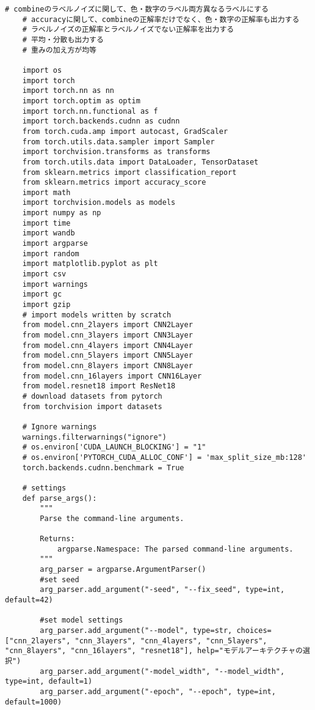 \begin{lstlisting}[style=pythonstyle, caption={メインコード}]
    # combineのラベルノイズに関して、色・数字のラベル両方異なるラベルにする
    # accuracyに関して、combineの正解率だけでなく、色・数字の正解率も出力する
    # ラベルノイズの正解率とラベルノイズでない正解率を出力する
    # 平均・分散も出力する
    # 重みの加え方が均等
    
    import os
    import torch
    import torch.nn as nn
    import torch.optim as optim
    import torch.nn.functional as f
    import torch.backends.cudnn as cudnn
    from torch.cuda.amp import autocast, GradScaler
    from torch.utils.data.sampler import Sampler
    import torchvision.transforms as transforms
    from torch.utils.data import DataLoader, TensorDataset
    from sklearn.metrics import classification_report
    from sklearn.metrics import accuracy_score
    import math
    import torchvision.models as models
    import numpy as np
    import time
    import wandb
    import argparse
    import random
    import matplotlib.pyplot as plt
    import csv 
    import warnings
    import gc
    import gzip
    # import models written by scratch
    from model.cnn_2layers import CNN2Layer
    from model.cnn_3layers import CNN3Layer
    from model.cnn_4layers import CNN4Layer
    from model.cnn_5layers import CNN5Layer
    from model.cnn_8layers import CNN8Layer
    from model.cnn_16layers import CNN16Layer
    from model.resnet18 import ResNet18
    # download datasets from pytorch
    from torchvision import datasets
    
    # Ignore warnings
    warnings.filterwarnings("ignore")
    # os.environ['CUDA_LAUNCH_BLOCKING'] = "1"
    # os.environ['PYTORCH_CUDA_ALLOC_CONF'] = 'max_split_size_mb:128'
    torch.backends.cudnn.benchmark = True
    
    # settings
    def parse_args():
        """
        Parse the command-line arguments.
        
        Returns:
            argparse.Namespace: The parsed command-line arguments.
        """
        arg_parser = argparse.ArgumentParser()
        #set seed
        arg_parser.add_argument("-seed", "--fix_seed", type=int, default=42)
        
        #set model settings
        arg_parser.add_argument("--model", type=str, choices=["cnn_2layers", "cnn_3layers", "cnn_4layers", "cnn_5layers", "cnn_8layers", "cnn_16layers", "resnet18"], help="モデルアーキテクチャの選択")
        arg_parser.add_argument("-model_width", "--model_width", type=int, default=1)
        arg_parser.add_argument("-epoch", "--epoch", type=int, default=1000)
        

\end{lstlisting}
